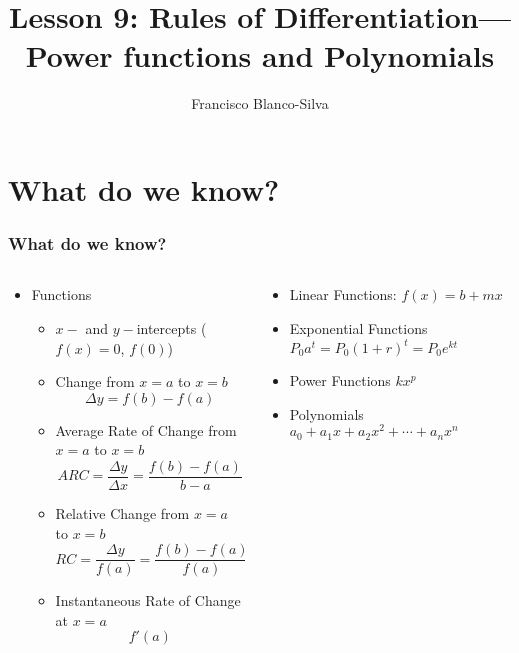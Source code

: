 \documentclass[9pt,xcolor=x11names,compress]{beamer}
\title{Lesson 9: Rules of Differentiation---Power functions and Polynomials}
\author[Francisco Blanco-Silva]{Francisco Blanco-Silva}
\institute[USC]{University of South Carolina}
\date{
\pgfdeclarelindenmayersystem{Funny curve}{
  \rule{F -> FF+F+F+F+FF}}
	\begin{tikzpicture} 
    \draw [DeepSkyBlue4]
    [l-system={Funny curve, axiom=F+F+F+F, order=4, step=1.5pt, angle=90}]
    lindenmayer system -- cycle; 
	\end{tikzpicture}
}
\begin{document}
\frame{\titlepage}

\section{What do we know?}
\begin{frame}
\frametitle{What do we know?}
\begin{columns}[T]
\begin{column}{0.6\linewidth}
\begin{itemize}
\item Functions
\begin{itemize}
\item $x-$ and $y-$\alert{intercepts} ($f(x)=0$, $f(0)$)
\item \alert{Change} from $x=a$ to $x=b$ 
\begin{equation*}
	\Delta y = f(b)-f(a)
\end{equation*}
\item \alert{Average Rate of Change} from $x=a$ to $x=b$
\begin{equation*}
ARC=\frac{\Delta y}{\Delta x}=\frac{f(b)-f(a)}{b-a} 
\end{equation*}
\item \alert{Relative Change} from $x=a$ to $x=b$
\begin{equation*}
RC=\frac{\Delta y}{f(a)}=\frac{f(b)-f(a)}{f(a)}
\end{equation*}
\item \alert{Instantaneous Rate of Change} at $x=a$
\begin{equation*}
	f'(a)
\end{equation*}
\end{itemize}
\end{itemize}
\end{column}
\begin{column}{0.4\linewidth}
\begin{itemize}
	\item Linear Functions: $f(x)=b+mx$
	\item Exponential Functions $P_0 a^t = P_0 (1+r)^t = P_0 e^{kt}$
	\item Power Functions \newline \makebox[1cm]{} $kx^p$
	\item Polynomials $a_0+a_1x+a_2x^2+\dotsb+a_n x^n$
\end{itemize}
\end{column}
\end{columns}
\end{frame}
\end{document}
